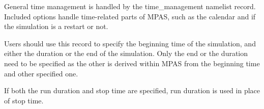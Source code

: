 General time management is handled by the time\_management namelist record.
Included options handle time-related parts of MPAS, such as the calendar and if the simulation is a restart or not.

Users should use this record to specify the beginning time of the simulation,
and either the duration or the end of the simulation. Only the end or the
duration need to be specified as the other is derived within MPAS from the
beginning time and other specified one.

If both the run duration and stop time are specified, run duration is used in place of stop time.


